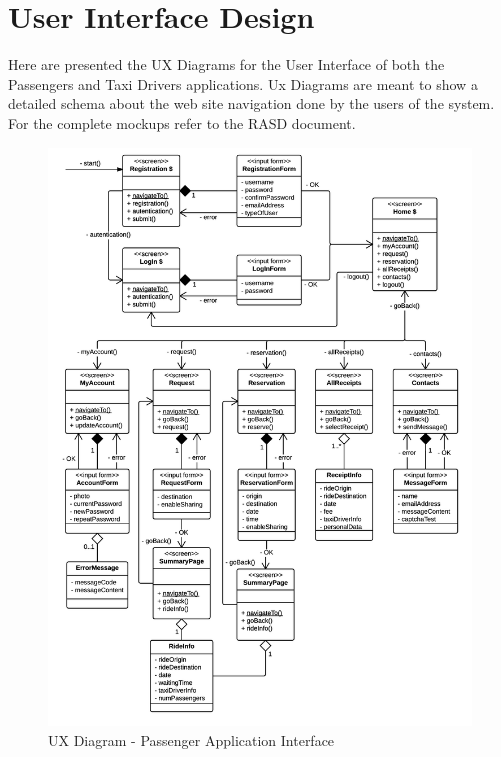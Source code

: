 \chapter{User Interface Design} \label{chap4}
Here are presented the UX Diagrams for the User Interface of both the Passengers and Taxi Drivers applications. Ux Diagrams are meant to show a detailed schema about the web site navigation done by the users of the system. For the complete mockups refer to the RASD document.

\begin{figure}[htbp]
\centering
\includegraphics[width=\textwidth]{cpt/img/UXPassengerApp}
\caption{UX Diagram - Passenger Application Interface}
\end{figure}
\clearpage

